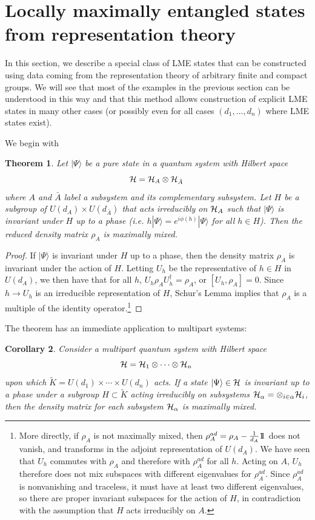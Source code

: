 \documentclass[12pt]{article}
\newtheorem{theorem}{Theorem}[section]
\newtheorem{corollary}[theorem]{Corollary}
\theoremstyle{definition}
\def\identity{{\rlap{1} \hskip 1.6pt \hbox{1}}}
\begin{document}
\section{Locally maximally entangled states from representation theory}

In this section, we describe a special class of LME states that can be constructed using data coming from the representation theory of arbitrary finite and compact groups. We will see that most of the examples in the previous section can be understood in this way and that this method allows construction of explicit LME states in many other cases (or possibly even for all cases $(d_1, \dots, d_n)$ where LME states exist).

We begin with
\begin{theorem}
Let $|\Psi \rangle$ be a pure state in a quantum system with Hilbert space
\[
{\cal H} = {\cal H}_A \otimes {\cal H}_{\bar{A}} \;
\]
where $A$ and $\bar{A}$ label a subsystem and its complementary
subsystem. Let $H$ be a subgroup of $U(d_A) \times U(d_{\bar{A}})$
that acts irreducibly on ${\cal H}_A$ such that $|\Psi \rangle$ is
invariant under $H$ up to a phase (i.e. $h|\Psi \rangle = e^{i
\phi(h)}|\Psi \rangle$ for all $h \in H$). Then the reduced density
matrix $\rho_A$ is maximally mixed.
\end{theorem}
\begin{proof}
If $|\Psi \rangle$ is invariant under $H$ up to a phase, then the density matrix $\rho_A$ is invariant under the action of $H$. Letting $U_h$ be the representative of $h \in H$ in $U(d_A)$, we then have that for all $h$, $U_h \rho_A U_h^\dagger = \rho_A$, or $[U_h, \rho_A] = 0$. Since $h \to U_h$ is an irreducible representation of $H$, Schur's Lemma implies that $\rho_A$ is a multiple of the identity operator.\footnote{More directly, if $\rho_A$ is not maximally mixed, then $\rho_A^{ad} = \rho_A - {1 \over d_A} \identity$ does not vanish, and transforms in the adjoint representation of $U(d_A)$. We have seen that $U_h$ commutes with $\rho_A$ and therefore with $\rho^{ad}_A$ for all $h$. Acting on $A$, $U_h$ therefore does not mix subspaces with different eigenvalues for $\rho^{ad}_A$. Since $\rho^{ad}_A$ is nonvanishing and traceless, it must have at least two different eigenvalues, so there are proper invariant subspaces for the action of $H$, in contradiction with the assumption that $H$ acts irreducibly on $A$.}
\end{proof}
The theorem has an immediate application to multipart systems:
\begin{corollary}
Consider a multipart quantum system with Hilbert space
\[
{\cal H} = {\cal H}_1 \otimes \cdots \otimes {\cal H}_n \;
\]
upon which $\tilde{K} = U(d_1) \times \cdots \times U(d_n)$ acts. If a state $|\Psi \rangle \in {\cal H}$ is invariant up to a phase under a subgroup $H \subset \tilde{K}$ acting irreducibly on subsystems ${\cal H}_{\alpha} = \otimes_{i \in \alpha} {\cal H}_i$, then the density matrix for each subsystem ${\cal H}_{\alpha}$ is maximally mixed.
\end{corollary}
\end{document}
